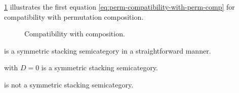 \cref{fig:compatibility-perm-comp} illustrates the first equation \cref{eq:perm-compatibility-with-perm-comp} for compatibility with permutation composition.

\begin{figure}[h]
    \centering
     \qquad \qquad
    \caption{Compatibility with composition. }
    \label{fig:compatibility-perm-comp}
\end{figure}




\begin{example}
    \SetL is a symmetric stacking semicategory in a straightforward manner.
\end{example}


\begin{example}
    \LTI with $D=0$ is a symmetric stacking semicategory.
\end{example}

\begin{lemma}
    \label{lem:effects-not-symmetric}
    \Effects is not a symmetric stacking semicategory.
\end{lemma}



